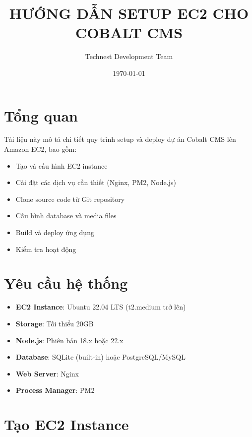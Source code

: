\documentclass[12pt,a4paper]{article}
\title{\textbf{HƯỚNG DẪN SETUP EC2 CHO COBALT CMS}}
\author{Technest Development Team}
\date{\today}
\begin{document}
\maketitle
\tableofcontents
\newpage

\section{Tổng quan}
Tài liệu này mô tả chi tiết quy trình setup và deploy dự án Cobalt CMS lên Amazon EC2, bao gồm:
\begin{itemize}
    \item Tạo và cấu hình EC2 instance
    \item Cài đặt các dịch vụ cần thiết (Nginx, PM2, Node.js)
    \item Clone source code từ Git repository
    \item Cấu hình database và media files
    \item Build và deploy ứng dụng
    \item Kiểm tra hoạt động
\end{itemize}

\section{Yêu cầu hệ thống}
\begin{itemize}
    \item \textbf{EC2 Instance}: Ubuntu 22.04 LTS (t2.medium trở lên)
    \item \textbf{Storage}: Tối thiểu 20GB
    \item \textbf{Node.js}: Phiên bản 18.x hoặc 22.x
    \item \textbf{Database}: SQLite (built-in) hoặc PostgreSQL/MySQL
    \item \textbf{Web Server}: Nginx
    \item \textbf{Process Manager}: PM2
\end{itemize}

\section{Tạo EC2 Instance}
\end{document}
